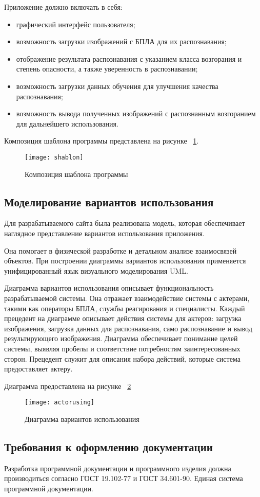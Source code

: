 Приложение должно включать в себя:
\begin{itemize}
    \item графический интерфейс пользователя;
    \item возможность загрузки изображений с БПЛА для их распознавания;
    \item отображение результата распознавания с указанием класса возгорания и степень опасности, а также уверенность в распознавании;
    \item возможность загрузки данных обучения для улучшения качества распознавания;
    \item возможность вывода полученных изображений с распознанным возгоранием для дальнейшего использования.
\end{itemize}

Композиция шаблона программы представлена на рисунке ~\ref{shablon:image}.

\begin{figure}[ht]
\texttt{[image: shablon]}
\caption{Композиция шаблона программы}
\label{shablon:image}
\end{figure}
\subsection{Моделирование вариантов использования}

Для разрабатываемого сайта была реализована модель, которая обеспечивает наглядное представление вариантов использования приложения.

Она помогает в физической разработке и детальном анализе взаимосвязей объектов. При построении диаграммы вариантов использования применяется унифицированный язык визуального моделирования UML.

Диаграмма вариантов использования описывает функциональность разрабатываемой системы. Она отражает взаимодействие системы с актерами, такими как операторы БПЛА, службы реагирования и специалисты. Каждый прецедент на диаграмме описывает действия системы для актеров: загрузка изображения, загрузка данных для распознавания, само распознавание и вывод результирующего изображения. Диаграмма обеспечивает понимание целей системы, выявляя пробелы и соответствие потребностям заинтересованных сторон. Прецедент служит для описания набора действий, которые система предоставляет актеру.

Диаграмма предоставлена на рисунке ~\ref{actorusing:image}

\begin{figure}[ht]
\texttt{[image: actorusing]}
\caption{Диаграмма вариантов использования}
\label{actorusing:image}
\end{figure}

\subsection{Требования к оформлению документации}

Разработка программной документации и программного изделия должна производиться согласно ГОСТ 19.102-77 и ГОСТ 34.601-90. Единая система программной документации.
